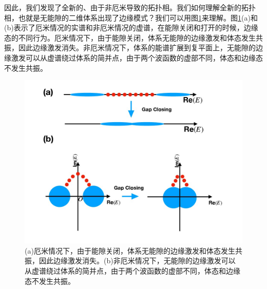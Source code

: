 \documentclass[supercite]{HustGraduPaper}
\begin{document}
   因此，我们发现了全新的、由于非厄米导致的拓扑相。我们如何理解全新的拓扑相，也就是无能隙的二维体系出现了边缘模式？我们可以用图\ref{fig:nonh3}来理解。图\ref{fig:nonh3}(a)和(b)表示了厄米情况的实谱和非厄米情况的虚谱，在能隙关闭和打开的时候，边缘态的不同行为。厄米情况下，由于能隙关闭，体系无能隙的边缘激发和体态发生共振，因此边缘激发消失。非厄米情况下，体系的能谱扩展到复平面上，无能隙的边缘激发可以从虚谱绕过体系的简并点，由于两个波函数的虚部不同，体态和边缘态不发生共振。
\begin{figure}
	\centering
	\includegraphics[width=1\linewidth]{Figures/topoinsu/nonh3}
	\caption{(a)厄米情况下，由于能隙关闭，体系无能隙的边缘激发和体态发生共振，因此边缘激发消失。(b)非厄米情况下，无能隙的边缘激发可以从虚谱绕过体系的简并点，由于两个波函数的虚部不同，体态和边缘态不发生共振。}
	\label{fig:nonh3}
\end{figure}
\end{document}
